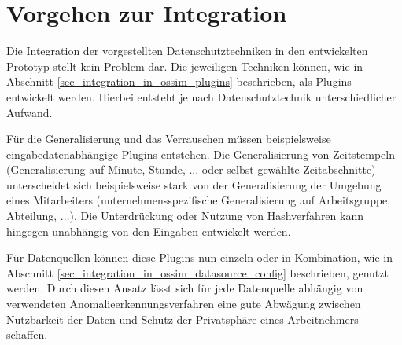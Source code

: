 \section{Vorgehen zur Integration}

Die Integration der vorgestellten Datenschutztechniken in den entwickelten Prototyp stellt kein Problem dar. Die jeweiligen Techniken können, wie in Abschnitt \ref{sec_integration_in_ossim_plugins} beschrieben, als Plugins entwickelt werden. Hierbei entsteht je nach Datenschutztechnik unterschiedlicher Aufwand.

Für die Generalisierung und das Verrauschen müssen beispielsweise eingabedatenabhängige Plugins entstehen. Die Generalisierung von Zeitstempeln (Generalisierung auf Minute, Stunde, ... oder selbst gewählte Zeitabschnitte) unterscheidet sich beispielsweise stark von der Generalisierung der Umgebung eines Mitarbeiters (unternehmensspezifische Generalisierung auf Arbeitsgruppe, Abteilung, ...). Die Unterdrückung oder Nutzung von Hashverfahren kann hingegen unabhängig von den Eingaben entwickelt werden.

Für Datenquellen können diese Plugins nun einzeln oder in Kombination, wie in Abschnitt \ref{sec_integration_in_ossim_datasource_config} beschrieben, genutzt werden. Durch diesen Ansatz lässt sich für jede Datenquelle abhängig von verwendeten Anomalieerkennungsverfahren eine gute Abwägung zwischen Nutzbarkeit der Daten und Schutz der Privatsphäre eines Arbeitnehmers schaffen.